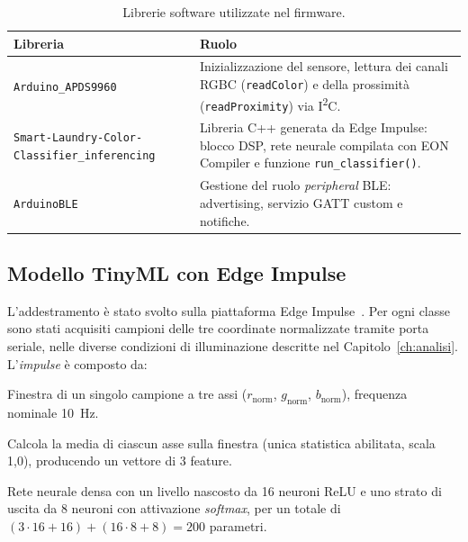 \documentclass[11pt,a4paper,twoside,openany]{report}
\newenvironment{toollist}{%
  \begin{description}[
    style=nextline,
    leftmargin=0pt,
    labelindent=0pt,
    font=\normalfont\bfseries,
    itemsep=6pt
  ]
}{%
  \end{description}
}
\newcommand{\rn}{r_{\mathrm{norm}}}
\newcommand{\gn}{g_{\mathrm{norm}}}
\newcommand{\bn}{b_{\mathrm{norm}}}
\begin{document}
\begin{table}[htbp]
\centering
\caption{Librerie software utilizzate nel firmware.}
\label{tab:librerie}
\begin{tabularx}{\textwidth}{@{}>{\raggedright\arraybackslash}p{4.3cm}X@{}}
\toprule
\textbf{Libreria} & \textbf{Ruolo} \\
\midrule
\texttt{Arduino\_APDS9960} & Inizializzazione del sensore, lettura dei
  canali RGBC (\texttt{readColor}) e della prossimità
  (\texttt{readProximity}) via I\textsuperscript{2}C. \\
\texttt{Smart-Laundry-Color-}\newline\texttt{Classifier\_inferencing} & Libreria C++
  generata da Edge Impulse: blocco DSP, rete neurale compilata con EON
  Compiler e funzione \texttt{run\_classifier()}. \\
\texttt{ArduinoBLE} & Gestione del ruolo \textit{peripheral} BLE:
  advertising, servizio GATT custom e notifiche. \\
\bottomrule
\end{tabularx}
\end{table}

\subsection{Modello TinyML con Edge Impulse}

L'addestramento è stato svolto sulla piattaforma Edge
Impulse~\cite{edgeimpulse}. Per ogni classe sono stati acquisiti
campioni delle tre coordinate normalizzate tramite porta seriale, nelle
diverse condizioni di illuminazione descritte nel
Capitolo~\ref{ch:analisi}. L'\textit{impulse} è composto da:

\begin{toollist}
  \item[Ingresso]
        Finestra di un singolo campione a tre assi
        ($\rn$, $\gn$, $\bn$), frequenza nominale \SI{10}{Hz}.
  \item[Blocco di elaborazione \textit{Flatten}]
        Calcola la media di ciascun asse sulla finestra (unica
        statistica abilitata, scala 1,0), producendo un vettore di 3
        feature.
  \item[Blocco di apprendimento \textit{Classification}]
        Rete neurale densa con un livello nascosto da 16 neuroni ReLU e
        uno strato di uscita da 8 neuroni con attivazione
        \textit{softmax}, per un totale di
        $(3 \cdot 16 + 16) + (16 \cdot 8 + 8) = 200$ parametri.
\end{toollist}
\end{document}
